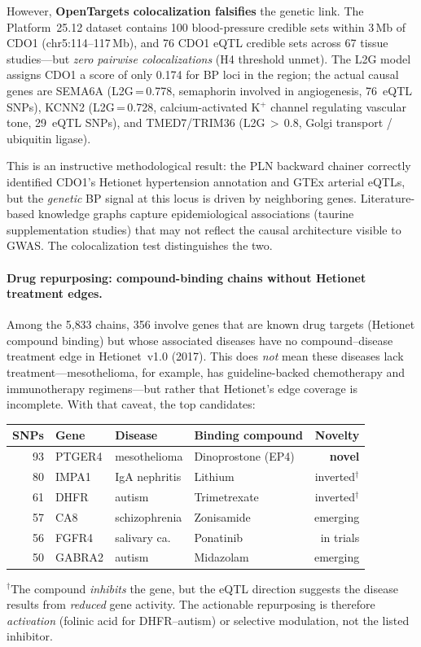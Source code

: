 \documentclass[11pt,openany]{report}
\begin{document}
However, \textbf{OpenTargets colocalization falsifies} the genetic
link.  The Platform~25.12 dataset contains 100 blood-pressure credible
sets within 3\,Mb of CDO1 (chr5:114--117\,Mb), and 76 CDO1 eQTL
credible sets across 67 tissue studies---but \emph{zero pairwise
colocalizations} (H4 threshold unmet).  The L2G model assigns
CDO1 a score of only 0.174 for BP loci in the region; the actual
causal genes are SEMA6A (L2G\,=\,0.778, semaphorin involved in
angiogenesis, 76~eQTL SNPs), KCNN2 (L2G\,=\,0.728, calcium-activated
K$^+$ channel regulating vascular tone, 29~eQTL SNPs), and
TMED7/TRIM36 (L2G\,$>$\,0.8, Golgi transport / ubiquitin ligase).

This is an instructive methodological result: the PLN backward chainer
correctly identified CDO1's Hetionet hypertension annotation and
GTEx arterial eQTLs, but the \emph{genetic} BP signal at this locus
is driven by neighboring genes.  Literature-based knowledge graphs
capture epidemiological associations (taurine supplementation studies)
that may not reflect the causal architecture visible to GWAS\@.  The
colocalization test distinguishes the two.

\paragraph{Drug repurposing: compound-binding chains without Hetionet treatment edges.}
Among the 5{,}833 chains, 356 involve genes that are known
drug targets (Hetionet compound binding) but whose associated
diseases have no compound--disease treatment edge in
Hetionet~v1.0 (2017).  This does \emph{not} mean these
diseases lack treatment---mesothelioma, for example, has
guideline-backed chemotherapy and immunotherapy
regimens---but rather that Hetionet's edge coverage is
incomplete.  With that caveat, the top candidates:

\begin{center}
\small
\begin{tabular}{rlllr}
\toprule
SNPs & Gene & Disease & Binding compound & Novelty \\
\midrule
93  & PTGER4 & mesothelioma & Dinoprostone (EP4) & \textbf{novel} \\
80  & IMPA1  & IgA nephritis & Lithium & inverted$^\dagger$ \\
61  & DHFR   & autism & Trimetrexate & inverted$^\dagger$ \\
57  & CA8    & schizophrenia & Zonisamide & emerging \\
56  & FGFR4  & salivary ca. & Ponatinib & in trials \\
50  & GABRA2 & autism & Midazolam & emerging \\
\bottomrule
\end{tabular}
\end{center}
{\footnotesize $^\dagger$The compound \emph{inhibits} the gene,
but the eQTL direction suggests the disease results from
\emph{reduced} gene activity.  The actionable repurposing is
therefore \emph{activation} (folinic acid for DHFR--autism)
or selective modulation, not the listed inhibitor.}
\end{document}
